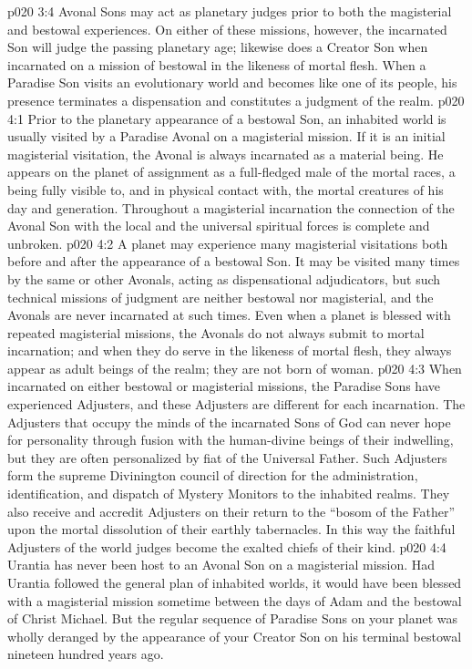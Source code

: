 \vs p020 3:4 Avonal Sons may act as planetary judges prior to both the magisterial and bestowal experiences. On either of these missions, however, the incarnated Son will judge the passing planetary age; likewise does a Creator Son when incarnated on a mission of bestowal in the likeness of mortal flesh. When a Paradise Son visits an evolutionary world and becomes like one of its people, his presence terminates a dispensation and constitutes a judgment of the realm.
\vs p020 4:1 Prior to the planetary appearance of a bestowal Son, an inhabited world is usually visited by a Paradise Avonal on a magisterial mission. If it is an initial magisterial visitation, the Avonal is always incarnated as a material being. He appears on the planet of assignment as a full\hyp{}fledged male of the mortal races, a being fully visible to, and in physical contact with, the mortal creatures of his day and generation. Throughout a magisterial incarnation the connection of the Avonal Son with the local and the universal spiritual forces is complete and unbroken.
\vs p020 4:2 A planet may experience many magisterial visitations both before and after the appearance of a bestowal Son. It may be visited many times by the same or other Avonals, acting as dispensational adjudicators, but such technical missions of judgment are neither bestowal nor magisterial, and the Avonals are never incarnated at such times. Even when a planet is blessed with repeated magisterial missions, the Avonals do not always submit to mortal incarnation; and when they do serve in the likeness of mortal flesh, they always appear as adult beings of the realm; they are not born of woman.
\vs p020 4:3 When incarnated on either bestowal or magisterial missions, the Paradise Sons have experienced Adjusters, and these Adjusters are different for each incarnation. The Adjusters that occupy the minds of the incarnated Sons of God can never hope for personality through fusion with the human\hyp{}divine beings of their indwelling, but they are often personalized by fiat of the Universal Father. Such Adjusters form the supreme Divinington council of direction for the administration, identification, and dispatch of Mystery Monitors to the inhabited realms. They also receive and accredit Adjusters on their return to the “bosom of the Father” upon the mortal dissolution of their earthly tabernacles. In this way the faithful Adjusters of the world judges become the exalted chiefs of their kind.
\vs p020 4:4 \pc Urantia has never been host to an Avonal Son on a magisterial mission. Had Urantia followed the general plan of inhabited worlds, it would have been blessed with a magisterial mission sometime between the days of Adam and the bestowal of Christ Michael. But the regular sequence of Paradise Sons on your planet was wholly deranged by the appearance of your Creator Son on his terminal bestowal nineteen hundred years ago.
